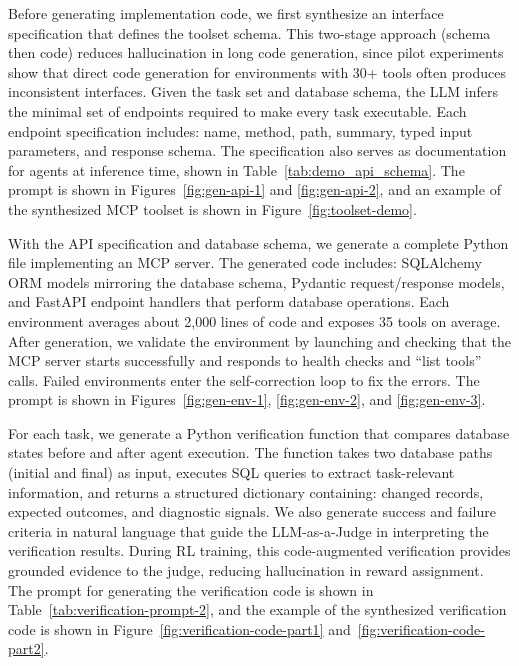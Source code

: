 Before generating implementation code, we first synthesize an interface specification that defines the toolset schema.
This two-stage approach (schema then code) reduces hallucination in long code generation, since pilot experiments show that direct code generation for environments with 30+ tools often produces inconsistent interfaces.
Given the task set and database schema, the LLM infers the minimal set of endpoints required to make every task executable.
Each endpoint specification includes: name, method, path, summary, typed input parameters, and response schema.
The specification also serves as documentation for agents at inference time, shown in Table~\ref{tab:demo_api_schema}.
The prompt is shown in Figures~\ref{fig:gen-api-1} and \ref{fig:gen-api-2}, and an example of the synthesized MCP toolset is shown in Figure~\ref{fig:toolset-demo}.

With the API specification and database schema, we generate a complete Python file implementing an MCP server.
The generated code includes: SQLAlchemy ORM models mirroring the database schema, Pydantic request/response models, and FastAPI endpoint handlers that perform database operations.
Each environment averages about 2,000 lines of code and exposes 35 tools on average.
After generation, we validate the environment by launching and checking that the MCP server starts successfully and responds to health checks and ``list tools'' calls.
Failed environments enter the self-correction loop to fix the errors.
The prompt is shown in Figures~\ref{fig:gen-env-1}, \ref{fig:gen-env-2}, and \ref{fig:gen-env-3}.

For each task, we generate a Python verification function that compares database states before and after agent execution.
The function takes two database paths (initial and final) as input, executes SQL queries to extract task-relevant information, and returns a structured dictionary containing: changed records, expected outcomes, and diagnostic signals.
We also generate success and failure criteria in natural language that guide the LLM-as-a-Judge in interpreting the verification results.
During RL training, this code-augmented verification provides grounded evidence to the judge, reducing hallucination in reward assignment.
The prompt for generating the verification code is shown in Table~\ref{tab:verification-prompt-2}, and the example of the synthesized verification code is shown in Figure~\ref{fig:verification-code-part1} and~\ref{fig:verification-code-part2}.

